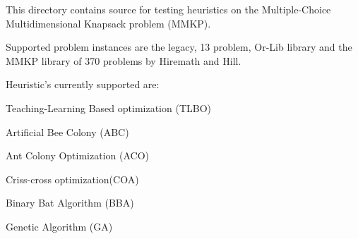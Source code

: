 This directory contains source for testing heuristics on the Multiple-\/\+Choice Multidimensional Knapsack problem (M\+M\+K\+P).

Supported problem instances are the legacy, 13 problem, Or-\/\+Lib library and the M\+M\+K\+P library of 370 problems by Hiremath and Hill. 

Heuristic’s currently supported are\+: 
\begin{DoxyItemize}
\item Teaching-\/\+Learning Based optimization (T\+L\+B\+O) 
\item Artificial Bee Colony (A\+B\+C) 
\item Ant Colony Optimization (A\+C\+O) 
\item Criss-\/cross optimization(\+C\+O\+A) 
\item Binary Bat Algorithm (B\+B\+A) 
\item Genetic Algorithm (G\+A) 
\end{DoxyItemize}